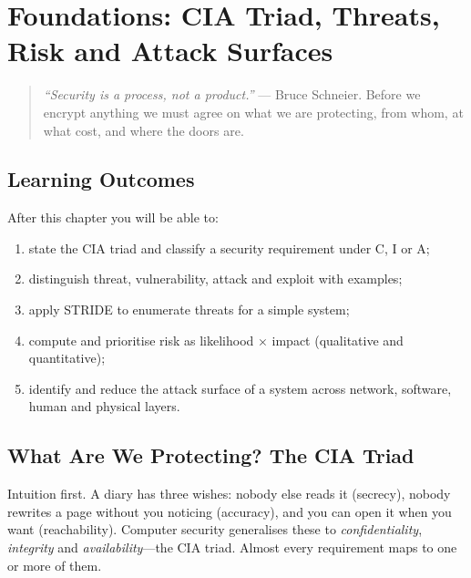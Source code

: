 \chapter{Foundations: CIA Triad, Threats, Risk and Attack Surfaces}
\label{ch:foundation}

\begin{quote}
\emph{``Security is a process, not a product.''} --- Bruce Schneier. Before we encrypt anything we must agree on what we are protecting, from whom, at what cost, and where the doors are.
\end{quote}

\noindent{}
\vspace{0.4em}

\section*{Learning Outcomes}
After this chapter you will be able to:
\begin{enumerate}[label=(L\arabic*)]
    \item state the CIA triad and classify a security requirement under C, I or A;
    \item distinguish threat, vulnerability, attack and exploit with examples;
    \item apply STRIDE to enumerate threats for a simple system;
    \item compute and prioritise risk as likelihood $\times$ impact (qualitative and quantitative);
    \item identify and reduce the attack surface of a system across network, software, human and physical layers.
\end{enumerate}

\section{What Are We Protecting? The CIA Triad}
\label{sec:cia}
Intuition first. A diary has three wishes: nobody else reads it (secrecy), nobody rewrites a page without you noticing (accuracy), and you can open it when you want (reachability). Computer security generalises these to \emph{confidentiality}, \emph{integrity} and \emph{availability}---the CIA triad. Almost every requirement maps to one or more of them.

